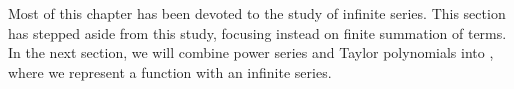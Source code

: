 %

\bigskip

Most of this chapter has been devoted to the study of infinite series. This section has stepped aside from this study, focusing instead on finite summation of terms. In the next section, we will combine power series and Taylor polynomials into , where we represent a function with an infinite series.


